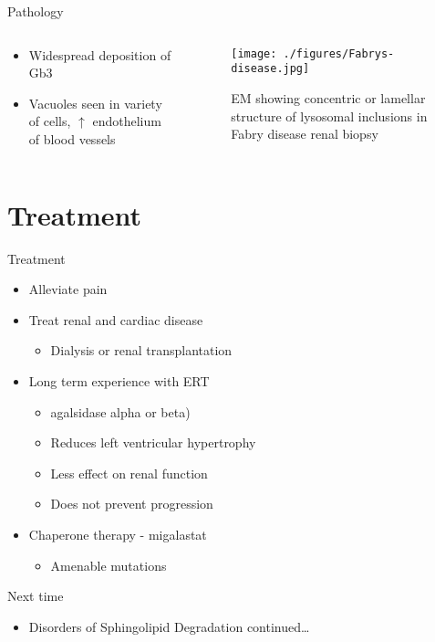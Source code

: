 \documentclass[presentation, smaller]{beamer}
\begin{document}
\begin{frame}[label={sec:orgheadline13}]{Pathology}
\begin{columns}
\begin{column}{0.5\columnwidth}
\begin{itemize}
\item Widespread deposition of Gb3
\item Vacuoles seen in variety of cells, \(\uparrow\) endothelium of blood vessels
\end{itemize}
\end{column}

\begin{column}{0.5\columnwidth}
\begin{figure}[htb]
\centering
\texttt{[image: ./figures/Fabrys-disease.jpg]}
\caption[em]{\label{fig:biopsy}
EM showing concentric or lamellar structure of lysosomal inclusions in Fabry disease renal biopsy}
\end{figure}
\end{column}
\end{columns}
\end{frame}




\section{Treatment}
\label{sec:orgheadline17}

\begin{frame}[label={sec:orgheadline15}]{Treatment}
\begin{itemize}
\item Alleviate pain
\item Treat renal and cardiac disease
\begin{itemize}
\item Dialysis or renal transplantation
\end{itemize}
\item Long term experience with ERT
\begin{itemize}
\item agalsidase alpha or beta)
\item Reduces left ventricular hypertrophy
\item Less effect on renal function
\item Does not prevent progression
\end{itemize}
\item Chaperone therapy - migalastat
\begin{itemize}
\item Amenable mutations
\end{itemize}
\end{itemize}
\end{frame}

\begin{frame}[label={sec:orgheadline16}]{Next time}
\begin{itemize}
\item Disorders of Sphingolipid Degradation continued\ldots{}
\end{itemize}
\end{frame}
\end{document}
